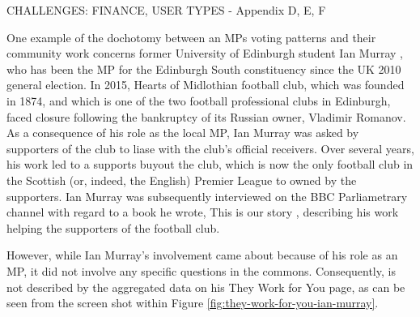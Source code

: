 \color{blue}
  CHALLENGES: FINANCE, USER TYPES - Appendix D, E, F
\color{darkgray}

One example of the dochotomy between an MPs voting patterns and their community work concerns former University of Edinburgh student Ian Murray \cite{ian-murray}, who has been the MP for the Edinburgh South constituency since the UK 2010 general election. 
In 2015, Hearts of Midlothian football club, which was founded in 1874, and which is one of the two football professional clubs in Edinburgh, faced closure following the bankruptcy of its Russian owner, Vladimir Romanov.
As a consequence of his role as the local MP, Ian Murray was asked by supporters of the club to liase with the club's official receivers.
Over several years, his work led to a supports buyout the club, which is now the only football club in the Scottish (or, indeed, the English) Premier League to owned by the supporters.
Ian Murray was subsequently interviewed \cite{ian-murray-bbc} on the BBC Parliametrary channel \cite{bbc-parliament} with regard to a book he wrote, This is our story \cite{ian-murray-this-is-our-story}, describing his work helping the supporters of the football club.

However, while Ian Murray’s involvement came about because of his role as an MP, it did not involve any specific questions in the commons.
Consequently, is not described by the aggregated data on his They Work for You page, as can be seen from the screen shot within Figure \ref{fig:they-work-for-you-ian-murray}.

